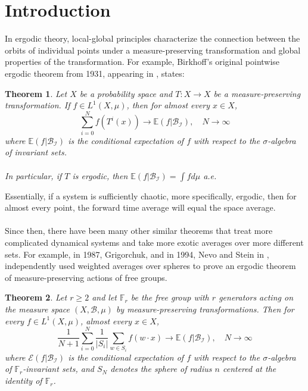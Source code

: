 \documentclass{article}
\newcommand{\abs}[1]{\left\vert#1\right\vert}
\newtheorem{theorem}{Theorem}[section]
\theoremstyle{definition}
\begin{document}
\section{Introduction}
In ergodic theory, local-global principles characterize the connection between the orbits of individual points under a measure-preserving transformation and global properties of the transformation. For example, 
Birkhoff's original pointwise ergodic theorem from 1931, appearing in \cite{birkhoffergodic}, states:
\begin{theorem}
    Let $ X $ be a probability space and $ T:X\rightarrow X $ be a measure-preserving transformation. If $ f\in L^1(X,\mu) $, then for almost every $ x\in X $,
    \[
    \sum_{i=0}^N f(T^i(x)) \rightarrow \mathbb{E}(f|\mathcal{B}_\mathcal{I}),\quad N\to \infty 
    \]
    where $ \mathbb{E}(f|\mathcal{B}_{\mathcal{I}}) $ is the conditional expectation of $ f $ with respect to the $ \sigma $-algebra of invariant sets.\\\\
    In particular, if $ T $ is ergodic, then $ \mathbb{E}(f|\mathcal{B}_\mathcal{I}) = \int fd\mu $ a.e.
\end{theorem}
\noindent Essentially, if a system is sufficiently chaotic, more specifically, ergodic, then for almost every point, the forward time average will equal the space average.\\\\
Since then, there have been many other similar theorems that treat more complicated dynamical systems and take more exotic averages over more different sets. For example, in 1987, Grigorchuk, and in 1994, Nevo and Stein in \cite{nevo1994generalization}, independently used weighted averages over spheres to prove an ergodic theorem of measure-preserving actions of free groups. 
\begin{theorem}
    Let $ r\geq 2 $ and let $ \mathbb{F}_r $ be the free group with $ r $ generators acting on the measure space $ (X,\mathcal{B},\mu) $ by measure-preserving transformations. Then for every $ f\in L^1(X,\mu) $, almost every $ x\in X $,
    \[
    \frac{1}{N+1} \sum_{i=0}^N \frac{1}{\abs{S_i}} \sum_{w\in S_i} f(w\cdot x) \to \mathbb{E}(f|\mathcal{B}_{\mathcal{I}}),\quad N\to \infty 
    \]
    where $ \mathcal{E}(f|\mathcal{B}_\mathcal{I}) $ is the conditional expectation of $ f $ with respect to the $ \sigma $-algebra of $ \mathbb{F}_r $-invariant sets, and $ S_N $ denotes the sphere of radius $ n $ centered at the identity of $ \mathbb{F}_r $.
\end{theorem}
\end{document}
